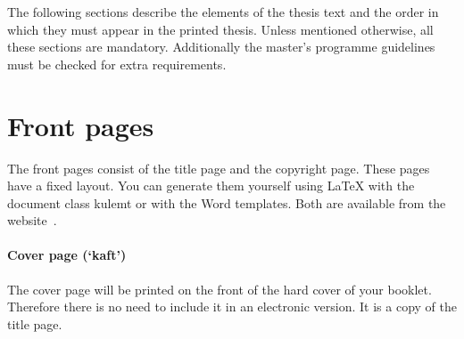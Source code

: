 \documentclass[11pt,article,oneside,british,extralanguage=dutch]{kulemt}
\newcommand*\cls[1]{\textsf{#1}}
\newcommand\Dutch[1]{`{\selectlanguage{dutch}#1}'}
\begin{document}
The following sections describe the elements of the thesis text and the
order in which they must appear in the printed thesis. Unless mentioned
otherwise, all these sections are mandatory. Additionally the master's programme
guidelines must be checked for extra requirements.

\section{Front pages}
The front pages consist of the title page and the copyright page. These
pages have a fixed layout. You can generate them yourself using LaTeX with the
document class \cls{kulemt} or with the Word templates. Both are available from
the website~\cite{templates}.

\paragraph{Cover page (\Dutch{kaft})} The cover page will be printed on the
front of the hard cover of your booklet. Therefore there is no need to include
it in an electronic version. It is a copy of the title page.
\end{document}
